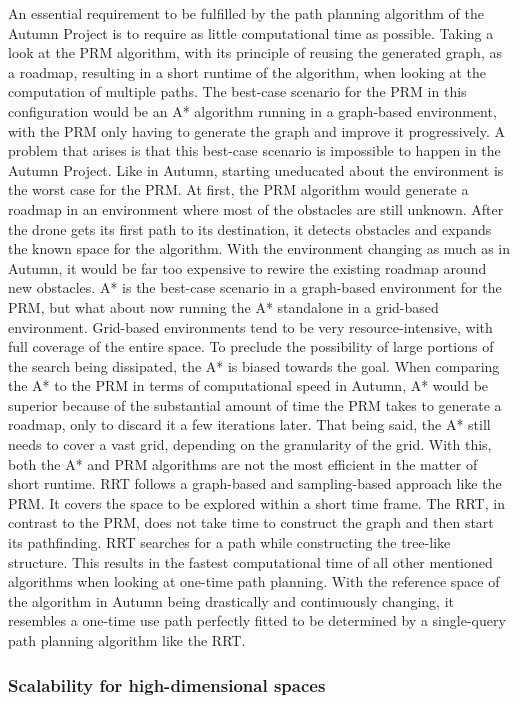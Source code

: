 An essential requirement to be fulfilled by the path planning algorithm of the Autumn Project is to require as little computational time as possible. Taking a look at the PRM algorithm, with its principle of reusing the generated graph, as a roadmap, resulting in a short runtime of the algorithm, when looking at the computation of multiple paths. The best-case scenario for the PRM in this configuration would be an A* algorithm running in a graph-based environment, with the PRM only having to generate the graph and improve it progressively. A problem that arises is that this best-case scenario is impossible to happen in the Autumn Project. Like in Autumn, starting uneducated about the environment is the worst case for the PRM. At first, the PRM algorithm would generate a roadmap in an environment where most of the obstacles are still unknown. After the drone gets its first path to its destination, it detects obstacles and expands the known space for the algorithm. With the environment changing as much as in Autumn, it would be far too expensive to rewire the existing roadmap around new obstacles. A* is the best-case scenario in a graph-based environment for the PRM, but what about now running the A* standalone in a grid-based environment. Grid-based environments tend to be very resource-intensive, with full coverage of the entire space. To preclude the possibility of large portions of the search being dissipated, the A* is biased towards the goal. When comparing the A* to the PRM in terms of computational speed in Autumn, A* would be superior because of the substantial amount of time the PRM takes to generate a roadmap, only to discard it a few iterations later. That being said, the A* still needs to cover a vast grid, depending on the granularity of the grid. With this, both the A* and PRM algorithms are not the most efficient in the matter of short runtime. RRT follows a graph-based and sampling-based approach like the PRM. It covers the space to be explored within a short time frame. The RRT, in contrast to the PRM, does not take time to construct the graph and then start its pathfinding. RRT searches for a path while constructing the tree-like structure. This results in the fastest computational time of all other mentioned algorithms when looking at one-time path planning. With the reference space of the algorithm in Autumn being drastically and continuously changing, it resembles a one-time use path perfectly fitted to be determined by a single-query path planning algorithm like the RRT.

\subsubsection{Scalability for high-dimensional spaces}

